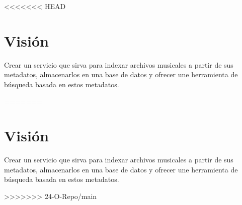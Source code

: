 <<<<<<< HEAD

\section*{Visión}

\noindent Crear un servicio que sirva para indexar archivos musicales a partir de sus 
metadatos, almacenarlos en una base de datos y ofrecer une herramienta de búsqueda basada
en estos metadatos.

=======

\section*{Visión}

\noindent Crear un servicio que sirva para indexar archivos musicales a partir de sus 
metadatos, almacenarlos en una base de datos y ofrecer une herramienta de búsqueda basada
en estos metadatos.

>>>>>>> 24-O-Repo/main
